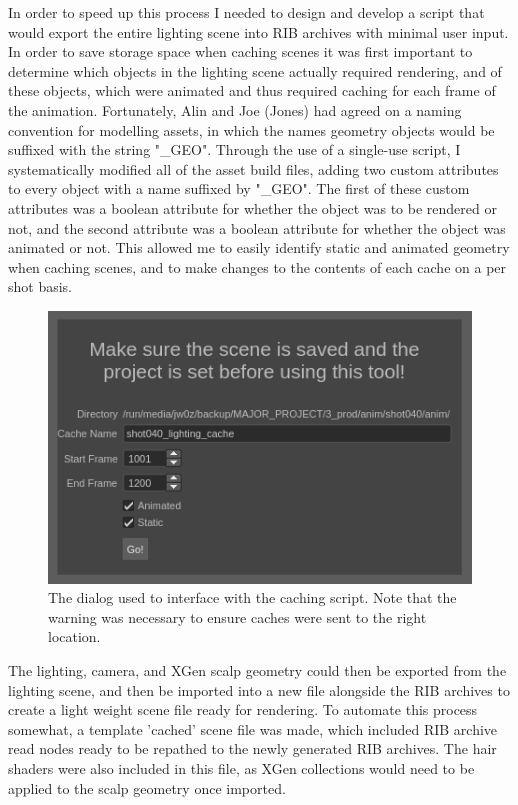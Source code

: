 \documentclass[11pt]{article}
\begin{document}
In order to speed up this process I needed to design and develop a script that would export the entire lighting scene into RIB archives with minimal user input. In order to save storage space when caching scenes it was first important to determine which objects in the lighting scene actually required rendering, and of these objects, which were animated and thus required caching for each frame of the animation. Fortunately, Alin and Joe (Jones) had agreed on a naming convention for modelling assets, in which the names geometry objects would be suffixed with the string "\_GEO". Through the use of a single-use script, I systematically modified all of the asset build files, adding two custom attributes to every object with a name suffixed by "\_GEO". The first of these custom attributes was a boolean attribute for whether the object was to be rendered or not, and the second attribute was a boolean attribute for whether the object was animated or not. This allowed me to easily identify static and animated geometry when caching scenes, and to make changes to the contents of each cache on a per shot basis.

\begin{figure}[htbp]\centering
	\includegraphics[width=1.0\linewidth]{images/cache_tool.png}
	\caption{\label{figure:cache_tool} The dialog used to interface with the caching script. Note that the warning was necessary to ensure caches were sent to the right location.}
\end{figure}

The lighting, camera, and XGen scalp geometry could then be exported from the lighting scene, and then be imported into a new file alongside the RIB archives to create a light weight scene file ready for rendering. To automate this process somewhat, a template 'cached' scene file was made, which included RIB archive read nodes ready to be repathed to the newly generated RIB archives. The hair shaders were also included in this file, as XGen collections would need to be applied to the scalp geometry once imported.
\end{document}
